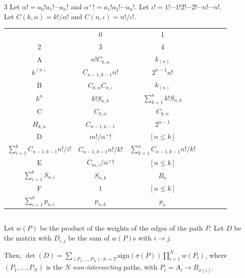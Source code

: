 \documentclass[landscape, 8pt, a4paper, oneside]{extarticle}
\begin{document}
\begin{multicols*}{3}
Let $\alpha! = a_0! a_1! \cdots a_n!$ and $\alpha^+! = a_1! a_2! \cdots a_n!$. Let $\iota! = 1! \cdots 1! 2! \cdots 2! \cdots n! \cdots n!$. \\
Let $C(k, \alpha) = k! / \alpha!$ and $C(n, \iota) = n! / \iota!$. \\ 
\begin{center} \begin{tabular}{|c|c|c|c|c|c|c|} \hline
  & 0                            & 1           \\ 2                                   & 3                    & 4                                   \\ \hline
A & $n! C_{k, \alpha}$           & $k_{(n)}$   \\ $k^{(n)}$                           & $C_{n-1, k-1} n!$    & $2^{n-1} n!$                        \\ \hline
B & $C_{k, \alpha} C_{n, \iota}$ & $k_{(n)}$   \\ $k^n$                               & $k! S_{n, k}$        & $\sum_{k=1}^{n} k! S_{n, k}$        \\ \hline
C & $C_{k, \alpha}$              & $C_{k, n}$  \\ $H_{k, n}$                          & $C_{n-1, k-1}$       & $2^{n-1}$                           \\ \hline
D & $m! / \alpha^+!$             & $[n \le k]$ \\ $\sum_{i=1}^{k} C_{n-1, k-1} n!/i!$ & $C_{n-1, k-1} n!/k!$ & $\sum_{k=1}^{n} C_{n-1, k-1} n!/k!$ \\ \hline
E & $C_{m, \iota} / \alpha^+!$   & $[n \le k]$ \\ $\sum_{i=1}^{k} S_{n, i}$           & $S_{n, k}$           & $B_n$                               \\ \hline
F & $1$                          & $[n \le k]$ \\ $\sum_{i=1}^{k} p_{n, i}$           & $p_{n, k}$           & $p_n$                               \\ \hline
\end{tabular} \end{center}
\subsection{}
Let $w(P)$ be the product of the weights of the edges of the path $P$. Let $D$ be the matrix with $D_{i,j}$ be the sum of $w(P)$s with $i \to j$.

Then, $\det(D) = \sum_{(P_1, \ldots, P_N) \colon S \to T} \mathrm{sign}(\sigma(P)) \prod_{i=1}^{N} w(P_i)$, where $(P_1, \ldots, P_N)$ is the $N$ \textit{non-intersecting} paths, with $P_i = A_i \to B_{\sigma(i)}$.


\end{multicols*}
\end{document}

